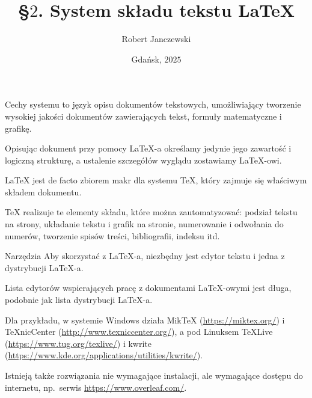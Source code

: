 \documentclass[polish,envcountsect,10pt]{beamer}
\title{\S\texorpdfstring{$2$}{2}. System składu tekstu {\fontfamily{lmr}\selectfont\mdseries\LaTeX}}
\author{Robert Janczewski}
\date{Gdańsk, \texorpdfstring{$2025$}{2025}}
\begin{document}
\frame{\titlepage}

\begin{frame}{Cechy systemu}
     to język opisu dokumentów tekstowych, umożliwiający tworzenie wysokiej jakości dokumentów zawierających tekst, formuły matematyczne i
    grafikę.
    \medskip

    Opisując dokument przy pomocy {\selectfont\mdseries\LaTeX}-a określamy jedynie jego zawartość i logiczną strukturę, a ustalenie szczegółów wyglądu zostawiamy
    {\selectfont\mdseries\LaTeX}-owi.
    \medskip

    {\selectfont\mdseries\LaTeX} jest de facto zbiorem makr dla systemu {\selectfont\mdseries\TeX}, który zajmuje się właściwym składem dokumentu.
    \medskip

    {\selectfont\mdseries\TeX} realizuje te elementy składu, które można zautomatyzować: podział tekstu na strony, układanie tekstu i grafik na stronie, numerowanie i odwołania do
    numerów, tworzenie spisów treści, bibliografii, indeksu itd.
\end{frame}

\begin{frame}{Narzędzia}
    Aby skorzystać z {\selectfont\mdseries\LaTeX}-a, niezbędny jest edytor tekstu i jedna z dystrybucji {\selectfont\mdseries\LaTeX}-a.
    \medskip

    Lista edytorów wspierających pracę z dokumentami {\selectfont\mdseries\LaTeX}-owymi jest długa, podobnie jak lista dystrybucji {\selectfont\mdseries\LaTeX}-a.
    \medskip

    Dla przykładu, w systemie Windows działa MikTeX (\url{https://miktex.org/}) i TeXnicCenter (\url{http://www.texniccenter.org/}), a pod Linuksem TeXLive (\url{https://www.tug.org/texlive/}) i
    kwrite (\url{https://www.kde.org/applications/utilities/kwrite/}).
    \medskip

    Istnieją także rozwiązania nie wymagające instalacji, ale wymagające dostępu do internetu, np.\ serwis \url{https://www.overleaf.com/}.
\end{frame}
\end{document}
